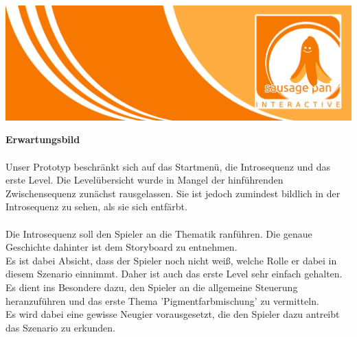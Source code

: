 \documentclass[10pt,a4paper,notitlepage]{report}
\author{Sausage Pan}
\begin{document}
	\newcommand{\Eins}[1]{\color{orange}\textbf{{\Large#1}}} %
	\newcommand{\Zwei}[1]{\color{orange}\textbf{{\large#1}}} %
	\newcommand{\Drei}[1]{\color{orange}{\normalsize#1}} %
	\newcommand{\Text}{\color{schwarz}} %
	\newcommand{\Fusszeile}
	{\textit{{\footnotesize Eckert, Georg - Roscher, Philipp - Krien, Alexandra - Sinakow, Sergej - Blasberg, Bettina - Groß, Stephanie Sara}}} %
	\marginpar{\vspace{3.0mm} \color{orange}\rule{0.8mm}{53.3mm} \\[3mm] \color{hellorange}\rule{0.8mm}{170mm}}
	\begin{center}
		\includegraphics[width=160mm]{header2}
	\end{center}
	\Eins{Erwartungsbild}\\\
\\
	\Text
	Unser Prototyp beschränkt sich auf das Startmenü, die Introsequenz und das erste Level. Die Levelübersicht wurde in Mangel der hinführenden Zwischensequenz 
	zunächst rausgelassen. Sie ist jedoch zumindest bildlich in der Introsequenz zu sehen, als sie sich entfärbt.\\
	\\
	Die Introsequenz soll den Spieler an die Thematik ranführen. Die genaue Geschichte dahinter ist dem Storyboard zu entnehmen.\\
	Es ist dabei Absicht, dass der Spieler noch nicht weiß, welche Rolle er dabei in diesem Szenario einnimmt.
	Daher ist auch das erste Level sehr einfach gehalten. Es dient ins Besondere dazu, den Spieler an die allgemeine Steuerung heranzuführen und das erste
	Thema 'Pigmentfarbmischung' zu vermitteln.\\
	Es wird dabei eine gewisse Neugier vorausgesetzt, die den Spieler dazu antreibt das Szenario zu erkunden.
\end{document}

